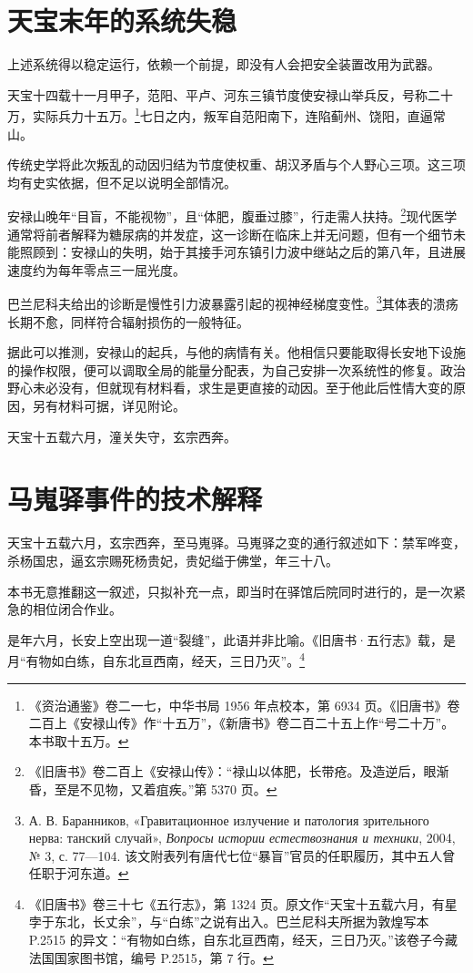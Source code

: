 \section{天宝末年的系统失稳}

上述系统得以稳定运行，依赖一个前提，即没有人会把安全装置改用为武器。

天宝十四载十一月甲子，范阳、平卢、河东三镇节度使安禄山举兵反，号称二十万，实际兵力十五万。\footnote{《资治通鉴》卷二一七，中华书局 1956 年点校本，第 6934 页。《旧唐书》卷二百上《安禄山传》作“十五万”，《新唐书》卷二百二十五上作“号二十万”。本书取十五万。}七日之内，叛军自范阳南下，连陷蓟州、饶阳，直逼常山。

传统史学将此次叛乱的动因归结为节度使权重、胡汉矛盾与个人野心三项。这三项均有史实依据，但不足以说明全部情况。

安禄山晚年“目盲，不能视物”，且“体肥，腹垂过膝”，行走需人扶持。\footnote{《旧唐书》卷二百上《安禄山传》：“禄山以体肥，长带疮。及造逆后，眼渐昏，至是不见物，又着疽疾。”第 5370 页。}现代医学通常将前者解释为糖尿病的并发症，这一诊断在临床上并无问题，但有一个细节未能照顾到：安禄山的失明，始于其接手河东镇引力波中继站之后的第八年，且进展速度约为每年零点三一屈光度。

巴兰尼科夫给出的诊断是慢性引力波暴露引起的视神经梯度变性。\footnote{А. В. Баранников, «Гравитационное излучение и патология зрительного нерва: танский случай», \textit{Вопросы истории естествознания и техники}, 2004, № 3, с. 77—104. 该文附表列有唐代七位“暴盲”官员的任职履历，其中五人曾任职于河东道。}其体表的溃疡长期不愈，同样符合辐射损伤的一般特征。

据此可以推测，安禄山的起兵，与他的病情有关。他相信只要能取得长安地下设施的操作权限，便可以调取全局的能量分配表，为自己安排一次系统性的修复。政治野心未必没有，但就现有材料看，求生是更直接的动因。至于他此后性情大变的原因，另有材料可据，详见附论。


天宝十五载六月，潼关失守，玄宗西奔。


\section{马嵬驿事件的技术解释}

天宝十五载六月，玄宗西奔，至马嵬驿。马嵬驿之变的通行叙述如下：禁军哗变，杀杨国忠，逼玄宗赐死杨贵妃，贵妃缢于佛堂，年三十八。

本书无意推翻这一叙述，只拟补充一点，即当时在驿馆后院同时进行的，是一次紧急的相位闭合作业。

是年六月，长安上空出现一道“裂缝”，此语并非比喻。《旧唐书·五行志》载，是月“有物如白练，自东北亘西南，经天，三日乃灭”。\footnote{《旧唐书》卷三十七《五行志》，第 1324 页。原文作“天宝十五载六月，有星孛于东北，长丈余”，与“白练”之说有出入。巴兰尼科夫所据为敦煌写本 P.2515 的异文：“有物如白练，自东北亘西南，经天，三日乃灭。”该卷子今藏法国国家图书馆，编号 P.2515，第 7 行。}

